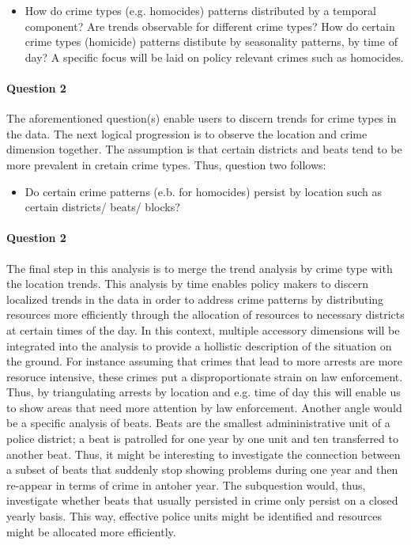 \documentclass[a4paper]{article}
\begin{document}
\begin{itemize}
  \item How do crime types (e.g. homocides) patterns distributed by a temporal component? Are trends observable for different crime types?
How do certain crime types (homicide) patterns distibute by seasonality patterns, by time of day? A specific focus will be laid on policy relevant crimes such as homocides.
\end{itemize}



\paragraph{Question 2} The aforementioned question(s) enable users to discern trends for crime types in the data. The next logical progression is to observe the location and crime dimension together. The assumption is that certain districts and beats tend to be more prevalent in cretain crime types. Thus, question two follows:

\begin{itemize}
  \item Do certain crime patterns (e.b. for homocides) persist by location such as certain districts/ beats/ blocks?
\end{itemize}

\paragraph{Question 2} The final step in this analysis is to merge the trend analysis by crime type with the location trends. This analysis by time enables policy makers to discern localized trends in the data in order to address crime patterns by distributing resources more efficiently through the allocation of resources to necessary districts at certain times of the day. In this context, multiple accessory dimensions will be integrated into the analysis to provide a hollistic description of the situation on the ground. For instance assuming that crimes that lead to more arrests are more resoruce intensive, these crimes put a disproportionate strain on law enforcement. Thus, by triangulating arrests by location and e.g. time of day this will enable us to show areas that need more attention by law enforcement. Another angle would be a specific analysis of beats. Beats are the smallest admininistrative unit of a police district; a beat is patrolled for one year by one unit and ten transferred to another beat. Thus, it might be interesting to investigate the connection between a subset of beats that suddenly stop showing problems during one year and then re-appear in terms of crime in antoher year. The subquestion would, thus, investigate whether beats that usually persisted in crime only persist on a closed yearly basis. This way, effective police units might be identified and resources might be allocated more efficiently.
 
\end{document}
